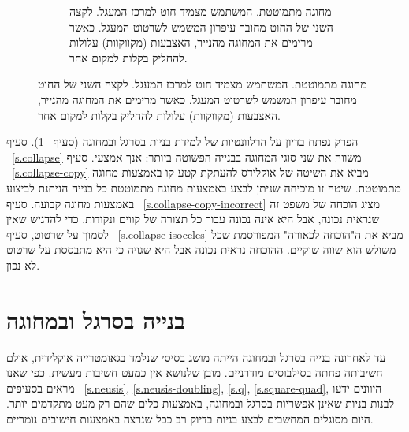 \begin{figure}[tb]
\begin{center}
\begin{subfigure}[b]{.4\textwidth}
\caption{%
מחוגה מתמוטטת. המשתמש מצמיד חוט למרכז המעגל. לקצה השני של החוט מחובר עיפרון המשמש לשרטוט המעגל. כאשר מרימים את המחוגה מהנייר, האצבעות (מקווקוות) עלולות להחליק בקלות למקום אחר.%
}\label{fig.collapsing-compass}
\end{subfigure}
\end{center}
\end{figure}

הפרק נפתח בדיון על הרלוונטיות של למידת בניות בסרגל ובמחוגה (סעיף%
~\ref{s.relevance}).
סעיף%
~\ref{s.collapse} 
משווה את שני סוגי המחוגה בבנייה הפשוטה ביותר: אנך אמצעי. סעיף%
~\ref{s.collapse-copy}
מביא את השיטה של אוקלידס להעתקת קטע קו באמצעות מחוגה מתמוטטת. שיטה זו מוכיחה שניתן לבצע באמצעות מחוגה מתמוטטת כל בנייה הניתנת לביצוע באמצעות מחוגה קבועה. סעיף%
~\ref{s.collapse-copy-incorrect} 
מציג הוכחה של משפט זה שנראית נכונה, אבל היא אינה נכונה עבור כל תצורה של קווים ונקודות. כדי להדגיש שאין לסמוך על שרטוט, סעיף%
~\ref{s.collapse-isoceles}
מביא את ה"הוכחה לכאורה" המפורסמת שכל משולש הוא שווה-שוקיים. ההוכחה נראית נכונה אבל היא שגויה כי היא מתבססת על שרטוט לא נכון.


\section{בנייה בסרגל ובמחוגה}\label{s.relevance}

עד לאחרונה בנייה בסרגל ובמחוגה הייתה מושג בסיסי שנלמד בגאומטרייה אוקלידית, אולם חשיבותה פחתה בסילבוסים מודרניים. מובן שלנושא אין כמעט חשיבות מעשית. כפי שאנו מראים בסעיפים%
~\ref{s.neusis}, \ref{s.neusis-doubling}, \ref{s.q}, \ref{s.square-quad},
היוונים ידעו לבנות בניות שאינן אפשריות בסרגל ובמחוגה, באמצעות כלים שהם רק מעט מתקדמים יותר. היום מסוגלים המחשבים לבצע בניות בדיוק רב ככל שנרצה באמצעות חישובים נומריים.

